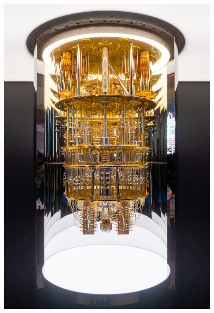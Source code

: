 \documentclass{beamer}
\begin{document}
\begin{frame}
\begin{columns}[t]
\begin{column}{.4\textwidth}
			\begin{figure}
				\centering
				\includegraphics[width=1\textwidth]{quantum_computer.jpeg}            
			\end{figure}
		\end{column}
	\end{columns}
			
			
			
\end{frame}
\end{document}
